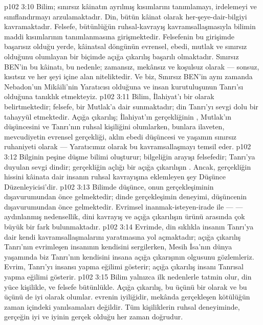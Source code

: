 \vs p102 3:10 Bilim; sınırsız kâinatın ayrılmış kısımlarını tanımlamayı, irdelemeyi ve sınıflandırmayı arzulamaktadır. Din, bütün kâinat olarak her\hyp{}şeye\hyp{}dair\hyp{}bilgiyi kavramaktadır. Felsefe, bütünlüğün ruhsal\hyp{}kavrayış kavramsallaşmasıyla bilimin maddi kısımlarının tanımlanmasına girişmektedir. Felsefenin bu girişimde başarısız olduğu yerde, kâinatsal döngünün evrensel, ebedi, mutlak ve sınırsız olduğunu olumlayan bir biçimde açığa çıkarılış başarılı olmaktadır. Sınırsız BEN’in bu kâinatı, bu nedenle; zamansız, mekânsız ve koşulsuz olarak --- sonsuz, kısıtsız ve her şeyi içine alan niteliktedir. Ve biz, Sınırsız BEN’in aynı zamanda Nebadon’un Mikâili’nin Yaratıcısı olduğuna ve insan kurutuluşunun Tanrı’sı olduğuna tanıklık etmekteyiz.
\vs p102 3:11 Bilim, İlahiyat’ı bir  olarak belirtmektedir; felsefe, bir Mutlak’a dair  sunmaktadır; din Tanrı’yı sevgi dolu bir  tahayyül etmektedir. Açığa çıkarılış; İlahiyat’ın gerçekliğinin , Mutlak’ın düşüncesini ve Tanrı’nın ruhsal kişiliğini olumlarken, bunlara ilaveten, mevcudiyetin evrensel gerçekliği, aklın ebedi düşüncesi ve yaşamın sınırsız ruhaniyeti olarak --- Yaratıcımız olarak bu kavramsallaşmayı temsil eder.
\vs p102 3:12 Bilginin peşine düşme bilimi oluşturur; bilgeliğin arayışı felsefedir; Tanrı’ya duyulan sevgi dindir; gerçekliğin açlığı bir açığa çıkarılışın . Ancak, gerçekliğin hissini kâinata dair insanın ruhsal kavrayışına eklemleyen şey Düşünce Düzenleyicisi’dir.
\vs p102 3:13 Bilimde düşünce, onun gerçekleşiminin dışavurumundan önce gelmektedir; dinde gerçekleşimin deneyimi, düşüncenin dışavurumundan önce gelmektedir. Evrimsel inanmak\hyp{}isteyen\hyp{}irade ile ---  --- aydınlanmış nedensellik, dini kavrayış ve açığa çıkarılışın ürünü arasında çok büyük bir fark bulunmaktadır.
\vs p102 3:14 Evrimde, din sıklıkla insanın Tanrı’ya dair kendi kavramsallaşmalarını yaratmasına yol açmaktadır; açığa çıkarılış Tanrı’nın evrimleşen insanının kendisini sergilerken, Mesih İsa’nın dünya yaşamında biz Tanrı’nın kendisini insana açığa çıkarışının olgusunu gözlemleriz. Evrim, Tanrı’yı insansı yapma eğilimi gösterir; açığa çıkarılış insanı Tanrısal yapma eğilimi gösterir.
\vs p102 3:15 Bilim yalnızca ilk nedenlerle tatmin olur, din yüce kişilikle, ve felsefe bütünlükle. Açığa çıkarılış, bu üçünü bir olarak ve bu üçünü de iyi olarak olumlar.  evrenin iyiliğidir, mekânda gerçekleşen kötülüğün zaman içindeki yanılsamaları değildir. Tüm kişiliklerin ruhsal deneyiminde, gerçeğin iyi ve iyinin gerçek olduğu her zaman doğrudur.
